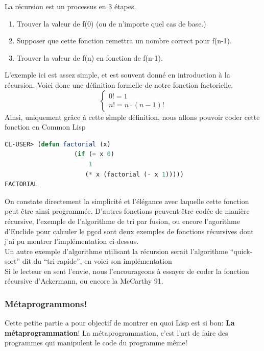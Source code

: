 \documentclass[a4paper, 12pt]{article}
\numberwithin{equation}{subsection}
\begin{document}
La récursion est un processus en 3 étapes. \\
\begin{enumerate}
  \item Trouver la valeur de f(0) (ou de n'importe quel cas de base.)
  \item Supposer que cette fonction remettra un nombre correct pour f(n-1).
  \item Trouver la valeur de f(n) en fonction de f(n-1).
\end{enumerate}
L'exemple ici est assez simple, et est souvent donné en introduction à la récursion. Voici donc une définition formelle de notre fonction factorielle. \\
$$\begin{cases}0! = 1 \\ n! = n \cdot (n - 1)! \end{cases}$$
Ainsi, uniquement grâce à cette simple définition, nous allons pouvoir coder cette fonction en Common Lisp \\
\begin{lstlisting}[language=Lisp]
CL-USER> (defun factorial (x)
                   (if (= x 0)
                       1
                      (* x (factorial (- x 1)))))
FACTORIAL
\end{lstlisting}
On constate directement la simplicité et l'élégance avec laquelle cette fonction peut être ainsi programmée. D'autres fonctions peuvent-être codée de manière récursive, l'exemple de l'algorithme de tri par fusion, ou encore l'agorithme d'Euclide pour calculer le pgcd sont deux exemples de fonctions récursives dont j'ai pu montrer l'implémentation ci-dessus. \\

Un autre exemple d'algorithme utilisant la récursion serait l'algorithme ``quick-sort'' dit du ``tri-rapide'', en voici son implémentation \\


Si le lecteur en sent l'envie, nous l'encourageons à essayer de coder la fonction récursive d'Ackermann, ou encore la McCarthy 91. \\
\subsubsection{Métaprogrammons!}
Cette petite partie a pour objectif de montrer en quoi Lisp est si bon: {\bf La métaprogrammation}!
La métaprogrammation, c'est l'art de faire des programmes qui manipulent le code du programme même!\\
\end{document}
